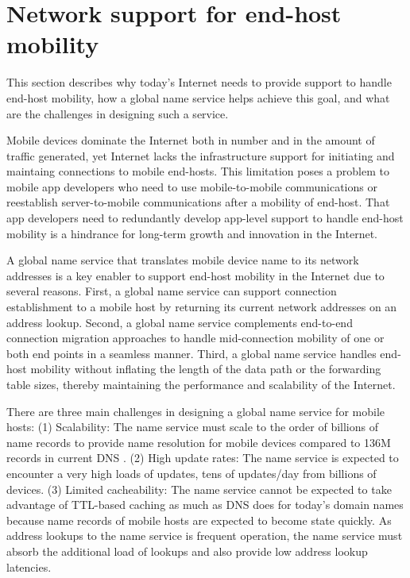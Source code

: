 


\section{Network support for end-host mobility}
This section describes why today's Internet needs to provide support to handle end-host mobility, how a global name service helps achieve this goal, and what are the challenges in designing such a service.

Mobile devices dominate the Internet both in number and in the amount of traffic generated, yet Internet lacks the infrastructure support for initiating and maintaing connections to mobile end-hosts.
This limitation poses a problem to mobile app developers who need to use mobile-to-mobile communications or reestablish server-to-mobile communications after a mobility of end-host. 
That app developers need to redundantly develop app-level support to handle end-host mobility is a hindrance for long-term growth and innovation in the Internet.


A global name service that translates mobile device name to its network addresses is a key enabler to support end-host mobility in the Internet due to several reasons.
First, a global name service can support connection establishment to a mobile host by returning its current network addresses on an address lookup.
Second, a global name service complements end-to-end connection migration approaches to handle mid-connection mobility of one or both end points in a seamless manner\cite{Migrate,ECCP,TCP-R}.
Third, a global name service handles end-host mobility without inflating the length of the data path or the forwarding table sizes, thereby maintaining the performance and scalability of the Internet.


There are three main challenges in designing a global name service for mobile hosts: (1) Scalability: The name service must scale to the order of billions of name records to provide name resolution for mobile devices compared to 136M records in current DNS \cite{whois}. (2) High update rates: The name service is expected to encounter a very high loads of updates, tens of updates/day from billions of devices.  (3) Limited cacheability: The name service cannot be expected to take advantage of TTL-based caching as much as DNS does for today's domain names because name records of mobile hosts are expected to become state quickly. As address lookups to the name service is frequent operation, the name service must absorb the additional load of lookups and also provide low address lookup latencies.



